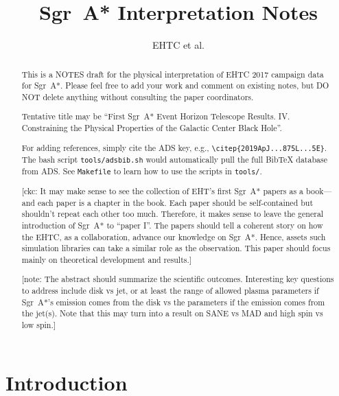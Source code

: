 \documentclass[twocolumn,tighten,dvipsnames]{aastex63}
\newcommand\sgra{Sgr~A*\xspace}
\newcommand\<{{\langle}}
\renewcommand\>{{\rangle}} %
\newcommand\note[1]{{\color{OliveGreen}[note: #1]}}
\newcommand\ckc[1]{{\color{MidnightBlue}[ckc: #1]}}
\begin{document}
\title{\sgra Interpretation Notes}
\author{EHTC et al.}

\shorttitle{\sgra Interpretation}

\revised{\today}

\begin{abstract}
  \color{BrickRed}

  This is a NOTES draft for the physical interpretation of EHTC 2017
  campaign data for \sgra.
  Please feel free to add your work and comment on existing notes, but
  DO NOT delete anything without consulting the paper coordinators.

  Tentative title may be ``First \sgra Event Horizon Telescope
  Results. IV. Constraining the Physical Properties of the Galactic
  Center Black Hole''.

  For adding references, simply cite the ADS key, e.g.,
  \texttt{\textbackslash citep\{2019ApJ...875L...5E\}}.
  The bash script \texttt{tools/adsbib.sh} would automatically pull
  the full BibTeX database from ADS.
  See \texttt{Makefile} to learn how to use the scripts in
  \texttt{tools/}.

  \ckc{It may make sense to see the collection of EHT's first \sgra
    papers as a book---and each paper is a chapter in the book.
    Each paper should be self-contained but shouldn't repeat each
    other too much.
    Therefore, it makes sense to leave the general introduction of
    \sgra to ``paper I''.
    The papers should tell a coherent story on how the EHTC, as a
    collaboration, advance our knowledge on \sgra.
    Hence, assets such simulation libraries can take a similar role as
    the observation.
    This paper should focus mainly on theoretical development and
    results.}

  \note{The abstract should summarize the scientific outcomes.
    Interesting key questions to address include disk vs jet, or at
    least the range of allowed plasma parameters if \sgra's emission
    comes from the disk vs the parameters if the emission comes from
    the jet(s).
    Note that this may turn into a result on SANE vs MAD and high spin
    vs low spin.}
\end{abstract}


\section{Introduction}
\label{sec:intro}
\end{document}
